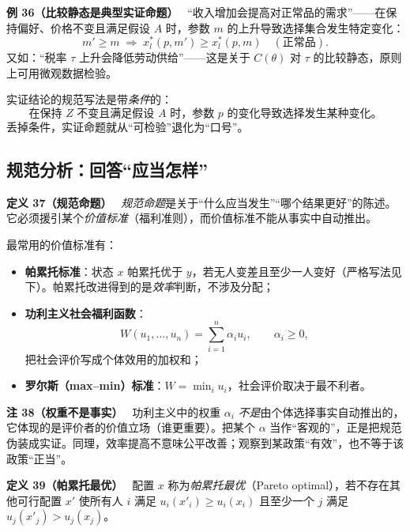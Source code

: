 \textbf{例 36}\textbf{（比较静态是典型实证命题）}　
“收入增加会提高对正常品的需求”——在保持偏好、价格不变且满足假设 $A$ 时，参数 $m$ 的上升导致选择集合发生特定变化：
\[
m'\ge m \;\Longrightarrow\; x_l^{*}(p,m')\ge x_l^{*}(p,m)\quad(\text{正常品}).
\]
又如：“税率 $\tau$ 上升会降低劳动供给”——这是关于 $C(\theta)$ 对 $\tau$ 的比较静态，原则上可用微观数据检验。




实证结论的规范写法是带\emph{条件}的：
\[
\text{在保持 }Z\text{ 不变且满足假设 }A\text{ 时，参数 }p\text{ 的变化导致选择发生某种变化。}
\]
丢掉条件，实证命题就从“可检验”退化为“口号”。

\subsection{规范分析：回答“应当怎样”}



\textbf{定义 37}\textbf{（规范命题）}　
\emph{规范命题}是关于“什么应当发生”“哪个结果更好”的陈述。它必须援引某个\emph{价值标准}（福利准则），而价值标准不能从事实中自动推出。




最常用的价值标准有：
\begin{itemize}
  \item \textbf{帕累托标准}：状态 $x$ 帕累托优于 $y$，若无人变差且至少一人变好（严格写法见下）。帕累托改进得到的是\emph{效率}判断，不涉及分配；
  \item \textbf{功利主义社会福利函数}：
        \[
        W(u_1,\dots,u_n)=\sum_{i=1}^{n}\alpha_i u_i,\qquad \alpha_i\ge 0,
        \]
        把社会评价写成个体效用的加权和；
  \item \textbf{罗尔斯（max–min）标准}：$W=\min_i u_i$，社会评价取决于最不利者。
\end{itemize}



\textbf{注 38}\textbf{（权重不是事实）}　
功利主义中的权重 $\alpha_i$ \emph{不是}由个体选择事实自动推出的，它体现的是评价者的价值立场（谁更重要）。把某个 $\alpha$ 当作“客观的”，正是把规范伪装成实证。同理，效率提高不意味公平改善；观察到某政策“有效”，也不等于该政策“正当”。






\textbf{定义 39}\textbf{（帕累托最优）}　
配置 $x$ 称为\emph{帕累托最优}（Pareto optimal），若不存在其他可行配置 $x'$ 使所有人 $i$ 满足 $u_i(x'_i)\ge u_i(x_i)$ 且至少一个 $j$ 满足 $u_j(x'_j)>u_j(x_j)$。







